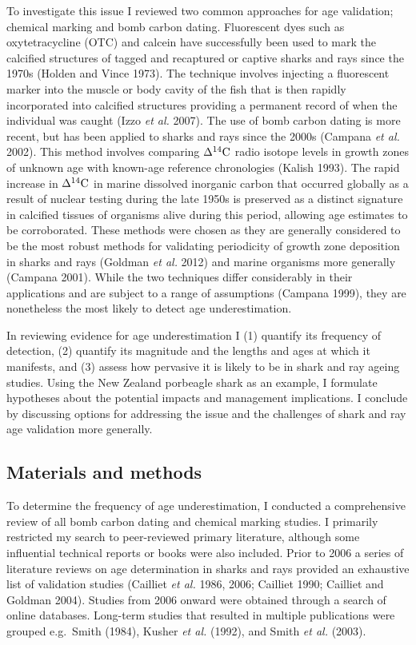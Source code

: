 \documentclass[]{article}
\begin{document}
To investigate this issue I reviewed two common approaches for age
validation; chemical marking and bomb carbon dating. Fluorescent dyes
such as oxytetracycline (OTC) and calcein have successfully been used to
mark the calcified structures of tagged and recaptured or captive sharks
and rays since the 1970s (Holden and Vince 1973). The technique involves
injecting a fluorescent marker into the muscle or body cavity of the
fish that is then rapidly incorporated into calcified structures
providing a permanent record of when the individual was caught (Izzo
\emph{et al.} 2007). The use of bomb carbon dating is more recent, but
has been applied to sharks and rays since the 2000s (Campana \emph{et
al.} 2002). This method involves comparing \(\Delta^{14}\textup{C}\)
radio isotope levels in growth zones of unknown age with known-age
reference chronologies (Kalish 1993). The rapid increase in
\(\Delta^{14}\textup{C}\) in marine dissolved inorganic carbon that
occurred globally as a result of nuclear testing during the late 1950s
is preserved as a distinct signature in calcified tissues of organisms
alive during this period, allowing age estimates to be corroborated.
These methods were chosen as they are generally considered to be the
most robust methods for validating periodicity of growth zone deposition
in sharks and rays (Goldman \emph{et al.} 2012) and marine organisms
more generally (Campana 2001). While the two techniques differ
considerably in their applications and are subject to a range of
assumptions (Campana 1999), they are nonetheless the most likely to
detect age underestimation.

In reviewing evidence for age underestimation I (1) quantify its
frequency of detection, (2) quantify its magnitude and the lengths and
ages at which it manifests, and (3) assess how pervasive it is likely to
be in shark and ray ageing studies. Using the New Zealand porbeagle
shark as an example, I formulate hypotheses about the potential impacts
and management implications. I conclude by discussing options for
addressing the issue and the challenges of shark and ray age validation
more generally.

\subsection{Materials and methods}\label{materials-and-methods}

To determine the frequency of age underestimation, I conducted a
comprehensive review of all bomb carbon dating and chemical marking
studies. I primarily restricted my search to peer-reviewed primary
literature, although some influential technical reports or books were
also included. Prior to 2006 a series of literature reviews on age
determination in sharks and rays provided an exhaustive list of
validation studies (Cailliet \emph{et al.} 1986, 2006; Cailliet 1990;
Cailliet and Goldman 2004). Studies from 2006 onward were obtained
through a search of online databases. Long-term studies that resulted in
multiple publications were grouped e.g.~Smith (1984), Kusher \emph{et
al.} (1992), and Smith \emph{et al.} (2003).
\end{document}
